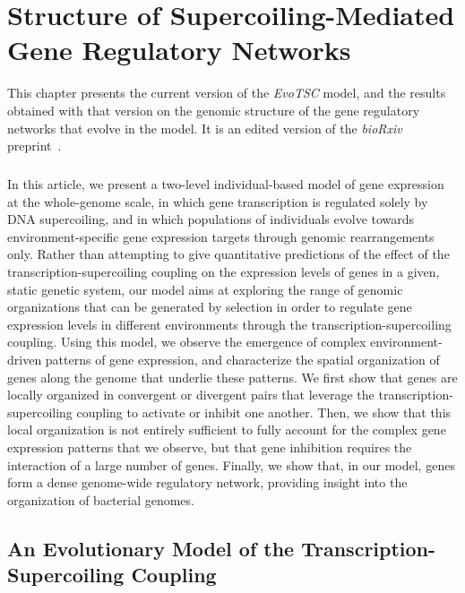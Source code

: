 \chapter{Structure of Supercoiling-Mediated Gene Regulatory Networks}
\label{chap:ploscb}

This chapter presents the current version of the \emph{EvoTSC} model, and the results obtained with that version on the genomic structure of the gene regulatory networks that evolve in the model.
It is an edited version of the \emph{bioRxiv} preprint~\citep{grohens2022b}.


\paragraph{}
In this article, we present a two-level individual-based model of gene expression at the whole-genome scale, in which gene transcription is regulated solely by DNA supercoiling, and in which populations of individuals evolve towards environment-specific gene expression targets through genomic rearrangements only.
Rather than attempting to give quantitative predictions of the  effect of the transcription-supercoiling coupling on the expression levels of genes in a given, static genetic system, our model aims at exploring the range of genomic organizations that can be generated by selection in order to regulate gene expression levels in different environments through the transcription-supercoiling coupling.
Using this model, we observe the emergence of complex environment-driven patterns of gene expression, and characterize the spatial organization of genes along the genome that underlie these patterns.
We first show that genes are locally organized in convergent or divergent pairs that leverage the transcription-supercoiling coupling to activate or inhibit one another.
Then, we show that this local organization is not entirely sufficient to fully account for the complex gene expression patterns that we observe, but that gene inhibition requires the interaction of a large number of genes.
Finally, we show that, in our model, genes form a dense genome-wide regulatory network, providing insight into the organization of bacterial genomes.


\section{An Evolutionary Model of the Transcription-Supercoiling Coupling}
\label{sec:ploscb:model}


